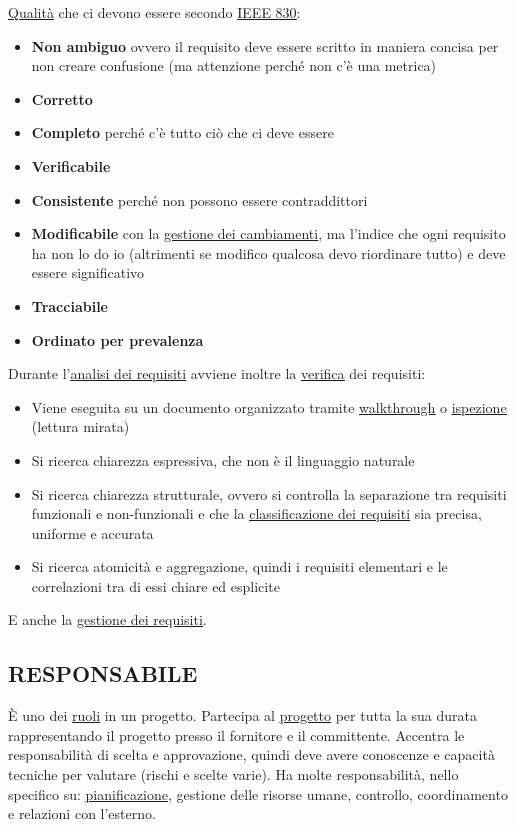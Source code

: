 		\underline{\hyperref[qualita]{Qualità}} che ci devono essere secondo \underline{\hyperref[ieee830]{IEEE 830}}:
		\begin{itemize} %
			\item \textbf{Non ambiguo} ovvero il requisito deve essere scritto in maniera concisa per non creare confusione (ma attenzione perché non c'è una metrica)
			\item \textbf{Corretto}
			\item \textbf{Completo} perché c'è tutto ciò che ci deve essere
			\item \textbf{Verificabile}
			\item \textbf{Consistente} perché non possono essere contraddittori
			\item \textbf{Modificabile} con la \underline{\hyperref[gestionecambiamenti]{gestione dei cambiamenti}}, ma l'indice che ogni requisito ha non lo do io (altrimenti se modifico qualcosa devo riordinare tutto) e deve essere significativo
			\item \textbf{Tracciabile}
			\item \textbf{Ordinato per prevalenza}
		\end{itemize}

		Durante l'\underline{\hyperref[analisideirequisiti]{analisi dei requisiti}} avviene inoltre la \underline{\hyperref[verificare]{verifica}} dei requisiti:
			\begin{itemize}
				\item Viene eseguita su un documento organizzato tramite \underline{\hyperref[walkthrough]{walkthrough}} o \underline{\hyperref[inspection]{ispezione}} (lettura mirata)
				\item Si ricerca chiarezza espressiva, che non è il linguaggio naturale
				\item Si ricerca chiarezza strutturale, ovvero si controlla la separazione tra requisiti funzionali e non-funzionali e che la \underline{\hyperref[classificazione]{classificazione dei requisiti}} sia precisa, uniforme e accurata
				\item Si ricerca atomicità e aggregazione, quindi i requisiti elementari e le correlazioni tra di essi chiare ed esplicite
			\end{itemize}
		E anche la \underline{\hyperref[gestionerequisiti]{gestione dei requisiti}}.


		\subsection{RESPONSABILE}  \label{responsabile}
		È uno dei \underline{\hyperref[ruoli]{ruoli}} in un progetto. Partecipa al \underline{\hyperref[progetto]{progetto}} per tutta la sua durata rappresentando il progetto presso il fornitore e il committente. Accentra le responsabilità di scelta e approvazione, quindi deve avere conoscenze e capacità tecniche per valutare (rischi e scelte varie). Ha molte responsabilità, nello specifico su: \underline{\hyperref[pianificazione]{pianificazione}}, gestione delle risorse umane, controllo, coordinamento e relazioni con l'esterno.


